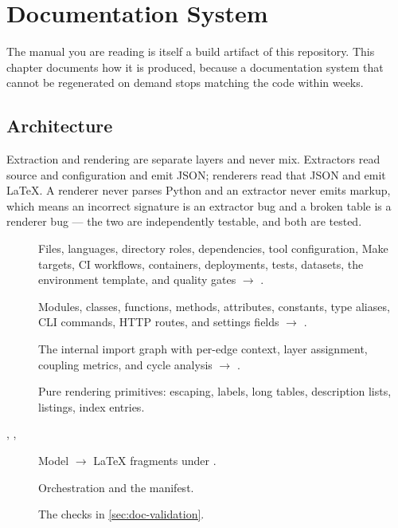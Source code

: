 
\chapter{Documentation System}
\label{ch:documentation-system}

The manual you are reading is itself a build artifact of this repository. This
chapter documents how it is produced, because a documentation system that
cannot be regenerated on demand stops matching the code within weeks.

\section{Architecture}



Extraction and rendering are separate layers and never mix. Extractors read
source and configuration and emit JSON; renderers read that JSON and emit
LaTeX. A renderer never parses Python and an extractor never emits markup,
which means an incorrect signature is an extractor bug and a broken table is a
renderer bug --- the two are independently testable, and both are tested.

\begin{description}
  \item[] Files, languages,
    directory roles, dependencies, tool configuration, Make targets, CI
    workflows, containers, deployments, tests, datasets, the environment
    template, and quality gates $\rightarrow$
    .
  \item[] Modules, classes, functions,
    methods, attributes, constants, type aliases, CLI commands, HTTP routes,
    and settings fields $\rightarrow$ .
  \item[] The internal import
    graph with per-edge context, layer assignment, coupling metrics, and cycle
    analysis $\rightarrow$ .
  \item[] Pure rendering primitives:
    escaping, labels, long tables, description lists, listings, index entries.
  \item[,
    , ]
    Model $\rightarrow$ LaTeX fragments under
    .
  \item[] Orchestration and the
    manifest.
  \item[] The checks in
    \cref{sec:doc-validation}.
\end{description}

